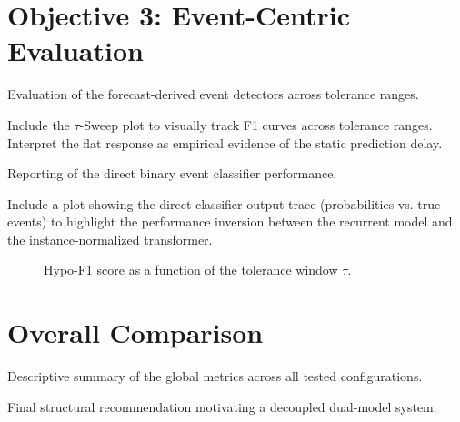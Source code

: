 \section{Objective 3: Event-Centric Evaluation} \label{sec:exp:obj3}
\begin{planned}
    \item Evaluation of the forecast-derived event detectors across tolerance ranges.
    \item Include the $\tau$-Sweep plot to visually track F1 curves across tolerance ranges. Interpret the flat response as empirical evidence of the static prediction delay.
    \item Reporting of the direct binary event classifier performance.
    \item Include a plot showing the direct classifier output trace (probabilities vs. true events) to highlight the performance inversion between the recurrent model and the instance-normalized transformer.
\end{planned}

\begin{figure}[H]
    \centering
    \caption{Hypo-F1 score as a function of the tolerance window $\tau$.}
    \label{fig:exp:tau_sweep_plot}
\end{figure}

\section{Overall Comparison} \label{sec:exp:overall}
\begin{planned}
    \item Descriptive summary of the global metrics across all tested configurations.
    \item Final structural recommendation motivating a decoupled dual-model system.
\end{planned}